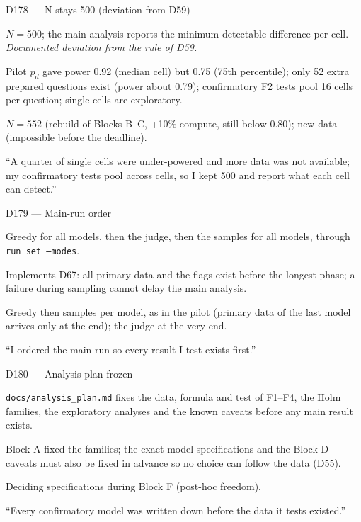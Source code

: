 \documentclass[11pt,a4paper]{report}
\begin{document}
\begin{decisionbox}{D178 --- N stays 500 (deviation from D59)}
\begin{description}[nosep, leftmargin=0pt]
  \item[Decision.] $N=500$; the main analysis reports the minimum detectable difference per cell. \emph{Documented deviation from the rule of D59.}
  \item[Why.] Pilot $p_d$ gave power 0.92 (median cell) but 0.75 (75th percentile); only 52 extra prepared questions exist (power about 0.79); confirmatory F2 tests pool 16 cells per question; single cells are exploratory.
  \item[Alternatives.] $N=552$ (rebuild of Blocks B--C, +10\% compute, still below 0.80); new data (impossible before the deadline).
  \item[Interview line.] ``A quarter of single cells were under-powered and more data was not available; my confirmatory tests pool across cells, so I kept 500 and report what each cell can detect.''
\end{description}
\end{decisionbox}

\begin{decisionbox}{D179 --- Main-run order}
\begin{description}[nosep, leftmargin=0pt]
  \item[Decision.] Greedy for all models, then the judge, then the samples for all models, through \texttt{run\_set --modes}.
  \item[Why.] Implements D67: all primary data and the flags exist before the longest phase; a failure during sampling cannot delay the main analysis.
  \item[Alternatives.] Greedy then samples per model, as in the pilot (primary data of the last model arrives only at the end); the judge at the very end.
  \item[Interview line.] ``I ordered the main run so every result I test exists first.''
\end{description}
\end{decisionbox}

\begin{decisionbox}{D180 --- Analysis plan frozen}
\begin{description}[nosep, leftmargin=0pt]
  \item[Decision.] \texttt{docs/analysis\_plan.md} fixes the data, formula and test of F1--F4, the Holm families, the exploratory analyses and the known caveats before any main result exists.
  \item[Why.] Block A fixed the families; the exact model specifications and the Block D caveats must also be fixed in advance so no choice can follow the data (D55).
  \item[Alternatives.] Deciding specifications during Block F (post-hoc freedom).
  \item[Interview line.] ``Every confirmatory model was written down before the data it tests existed.''
\end{description}
\end{decisionbox}
\end{document}
